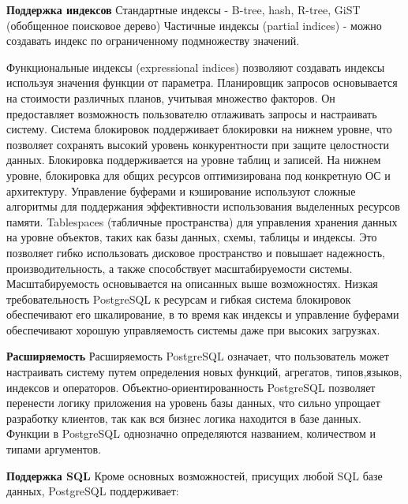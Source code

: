\textbf{Поддержка индексов} 
Стандартные индексы - B-tree, hash, R-tree, GiST (обобщенное поисковое дерево)
Частичные индексы (partial indices) - можно создавать индекс по ограниченному подмножеству значений.

Функциональные индексы (expressional indices) позволяют создавать индексы используя значения функции от параметра.
Планировщик запросов основывается на стоимости различных планов, учитывая множество факторов. Он предоставляет возможность пользователю отлаживать запросы и настраивать систему.
Система блокировок поддерживает блокировки на нижнем уровне, что позволяет сохранять высокий уровень конкурентности при защите целостности данных. Блокировка поддерживается на уровне таблиц и записей. На нижнем уровне, блокировка для общих ресурсов оптимизирована под конкретную ОС и архитектуру.
Управление буферами и кэширование используют сложные алгоритмы для поддержания эффективности использования выделенных ресурсов памяти.
Tablespaces (табличные пространства) для управления хранения данных на уровне объектов, таких как базы данных, схемы, таблицы и индексы. Это позволяет гибко использовать дисковое пространство и повышает надежность, производительность, а также способствует масштабируемости системы.
Масштабируемость основывается на описанных выше возможностях. Низкая требовательность PostgreSQL к ресурсам и гибкая система блокировок обеспечивают его шкалирование, в то время как индексы и управление буферами обеспечивают хорошую управляемость системы даже при высоких загрузках.

\textbf{Расширяемость} 
Расширяемость PostgreSQL означает, что пользователь может настраивать систему путем определения новых функций, агрегатов, типов,языков, индексов и операторов. Объектно-ориентированность PostgreSQL позволяет перенести логику приложения на уровень базы данных, что сильно упрощает разработку клиентов, так как вся бизнес логика находится в базе данных. Функции в PostgreSQL однозначно определяются названием, количеством и типами аргументов. 

\textbf{Поддержка SQL} 
Кроме основных возможностей, присущих любой SQL базе данных, PostgreSQL поддерживает:

